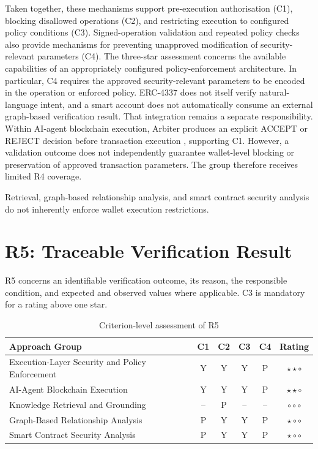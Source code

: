 Taken together, these mechanisms support
pre-execution authorisation (C1), blocking
disallowed operations (C2), and restricting
execution to configured policy conditions (C3).
Signed-operation validation and repeated policy
checks also provide mechanisms for preventing
unapproved modification of security-relevant
parameters (C4). The three-star assessment concerns the available
capabilities of an appropriately configured
policy-enforcement architecture. In particular,
C4 requires the approved security-relevant
parameters to be encoded in the operation or
enforced policy. ERC-4337 does not itself verify
natural-language intent, and a smart account does
not automatically consume an external graph-based
verification result. That integration remains a
separate responsibility. Within AI-agent blockchain execution, Arbiter
produces an explicit ACCEPT or REJECT decision
before transaction execution
\cite{yaoArbiter2026}, supporting C1.
However, a validation outcome does not
independently guarantee wallet-level blocking
or preservation of approved transaction
parameters. The group therefore receives
limited R4 coverage.

Retrieval, graph-based relationship analysis,
and smart contract security analysis do not
inherently enforce wallet execution restrictions.


\section{R5: Traceable Verification Result}

R5 concerns an identifiable verification
outcome, its reason, the responsible condition,
and expected and observed values where applicable.
C3 is mandatory for a rating above one star.

\begin{table}[H]
\centering
\small
\renewcommand{\arraystretch}{1.25}
\begin{tabular}{p{5.0cm}ccccc}
\hline
\textbf{Approach Group}
& \textbf{C1}
& \textbf{C2}
& \textbf{C3}
& \textbf{C4}
& \textbf{Rating} \\
\hline

Execution-Layer Security and Policy Enforcement
& Y & Y & Y & P
& $\star\star\circ$ \\

AI-Agent Blockchain Execution
& Y & Y & Y & P
& $\star\star\circ$ \\

Knowledge Retrieval and Grounding
& -- & P & -- & --
& $\circ\circ\circ$ \\

Graph-Based Relationship Analysis
& P & Y & Y & P
& $\star\circ\circ$ \\

Smart Contract Security Analysis
& P & Y & Y & P
& $\star\circ\circ$ \\

\hline
\end{tabular}
\caption{Criterion-level assessment of R5}
\label{tab:appendix_r5}
\end{table}

